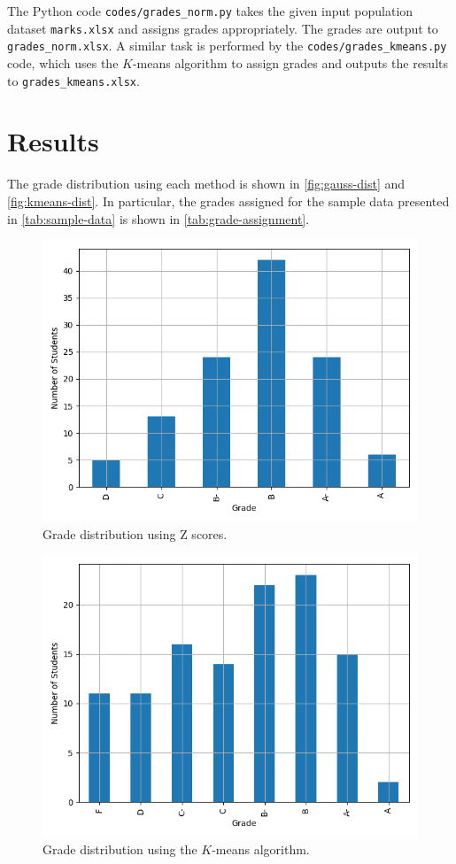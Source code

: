 \documentclass[conference]{IEEEtran}
\begin{document}
The Python code \texttt{codes/grades\_norm.py} takes the given input population
dataset \texttt{marks.xlsx} and assigns grades appropriately. The grades are
output to \texttt{grades\_norm.xlsx}. A similar task is performed by the
\texttt{codes/grades\_kmeans.py} code, which uses the $K$-means algorithm to
assign grades and outputs the results to \texttt{grades\_kmeans.xlsx}.

\section{Results}
\label{sec:results}
The grade distribution using each method is shown in \autoref {fig:gauss-dist}
and \autoref{fig:kmeans-dist}. In particular, the grades assigned for the sample
data presented in \autoref{tab:sample-data} is shown in
\autoref{tab:grade-assignment}.
\begin{figure}[!ht]
    \centering
    \includegraphics[width=\columnwidth]{figs/grades_gauss.png}
    \caption{Grade distribution using Z scores.}
    \label{fig:gauss-dist}
\end{figure}
\begin{figure}[!ht]
    \centering
    \includegraphics[width=\columnwidth]{figs/grades_kmeans.png}
    \caption{Grade distribution using the $K$-means algorithm.}
    \label{fig:kmeans-dist}
\end{figure}
\end{document}
